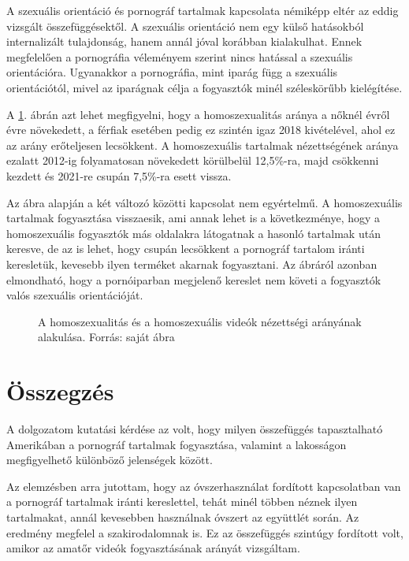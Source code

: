 \documentclass[12pt,a4paper]{article}
\begin{document}
A szexuális orientáció és pornográf tartalmak kapcsolata némiképp eltér az eddig vizsgált összefüggésektől. A szexuális orientáció nem egy külső hatásokból internalizált tulajdonság, hanem annál jóval korábban kialakulhat. Ennek megfelelően a pornográfia véleményem szerint nincs hatással a szexuális orientációra. Ugyanakkor a pornográfia, mint iparág függ a szexuális orientációtól, mivel az iparágnak célja a fogyasztók minél széleskörűbb kielégítése.

A \ref{homosexuality.homosexual}. ábrán azt lehet megfigyelni, hogy a homoszexualitás aránya a nőknél évről évre növekedett, a férfiak esetében pedig ez szintén igaz 2018 kivételével, ahol ez az arány erőteljesen lecsökkent. A homoszexuális tartalmak nézettségének aránya ezalatt 2012-ig folyamatosan növekedett körülbelül 12,5\%-ra, majd csökkenni kezdett és 2021-re csupán 7,5\%-ra esett vissza.

Az ábra alapján a két változó közötti kapcsolat nem egyértelmű. A homoszexuális tartalmak fogyasztása visszaesik, ami annak lehet is a következménye, hogy a homoszexuális fogyasztók más oldalakra látogatnak a hasonló tartalmak után keresve, de az is lehet, hogy csupán lecsökkent a pornográf tartalom iránti keresletük, kevesebb ilyen terméket akarnak fogyasztani. Az ábráról azonban elmondható, hogy a pornóiparban megjelenő kereslet nem követi a fogyasztók valós szexuális orientációját.

\begin{figure}[h]
    \caption[Homoszexuális videók és homoszexualitás]{\footnotesize{A homoszexualitás és a homoszexuális videók nézettségi arányának alakulása. Forrás: saját ábra}}
    \label{homosexuality.homosexual}
    \begin{center}
        
    \end{center}
\end{figure}

\section{Összegzés}

A dolgozatom kutatási kérdése az volt, hogy milyen összefüggés tapasztalható Amerikában a pornográf tartalmak fogyasztása, valamint a lakosságon megfigyelhető különböző jelenségek között.

Az elemzésben arra jutottam, hogy az óvszerhasználat fordított kapcsolatban van a pornográf tartalmak iránti kereslettel, tehát minél többen néznek ilyen tartalmakat, annál kevesebben használnak óvszert az együttlét során. Az eredmény megfelel a szakirodalomnak is. Ez az összefüggés szintúgy fordított volt, amikor az amatőr videók fogyasztásának arányát vizsgáltam.
\end{document}
